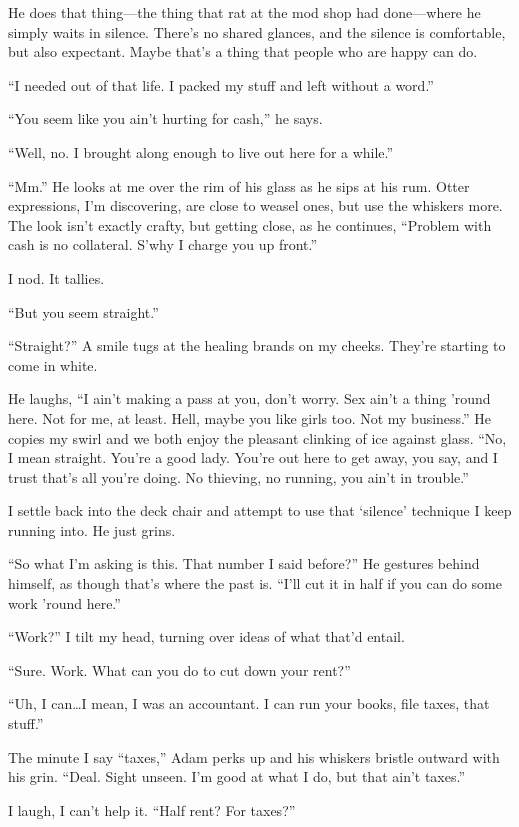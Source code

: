 He does that thing---the thing that rat at the mod shop had done---where he simply waits in silence. There's no shared glances, and the silence is comfortable, but also expectant. Maybe that's a thing that people who are happy can do.

``I needed out of that life. I packed my stuff and left without a word.''

``You seem like you ain't hurting for cash,'' he says.

``Well, no. I brought along enough to live out here for a while.''

``Mm.'' He looks at me over the rim of his glass as he sips at his rum. Otter expressions, I'm discovering, are close to weasel ones, but use the whiskers more. The look isn't exactly crafty, but getting close, as he continues, ``Problem with cash is no collateral. S'why I charge you up front.''

I nod. It tallies.

``But you seem straight.''

``Straight?'' A smile tugs at the healing brands on my cheeks. They're starting to come in white.

He laughs, ``I ain't making a pass at you, don't worry. Sex ain't a thing 'round here. Not for me, at least. Hell, maybe you like girls too. Not my business.'' He copies my swirl and we both enjoy the pleasant clinking of ice against glass. ``No, I mean straight. You're a good lady. You're out here to get away, you say, and I trust that's all you're doing. No thieving, no running, you ain't in trouble.''

I settle back into the deck chair and attempt to use that `silence' technique I keep running into. He just grins.

``So what I'm asking is this. That number I said before?'' He gestures behind himself, as though that's where the past is. ``I'll cut it in half if you can do some work 'round here.''

``Work?'' I tilt my head, turning over ideas of what that'd entail.

``Sure. Work. What can you do to cut down your rent?''

``Uh, I can\ldots{}I mean, I was an accountant. I can run your books, file taxes, that stuff.''

The minute I say ``taxes,'' Adam perks up and his whiskers bristle outward with his grin. ``Deal. Sight unseen. I'm good at what I do, but that ain't taxes.''

I laugh, I can't help it. ``Half rent? For taxes?''

